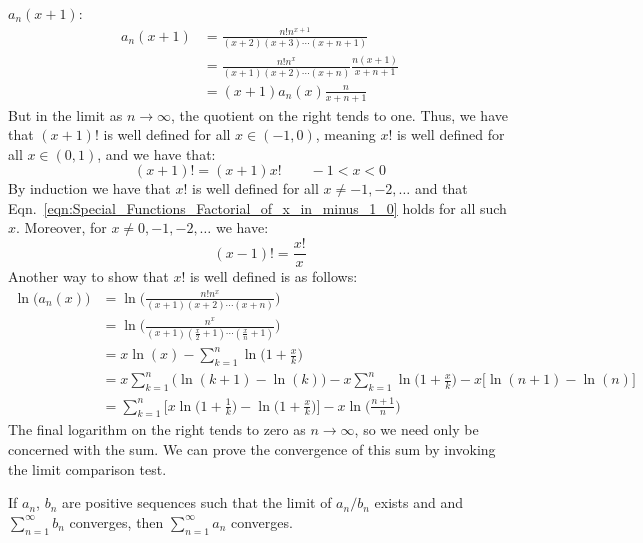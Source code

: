 \documentclass[crop=false,class=book,oneside]{standalone}
\begin{document}
        $a_{n}(x+1)$:
        \begin{align}
            a_{n}(x+1)
            &=\frac{n!n^{x+1}}{(x+2)(x+3)\cdots(x+n+1)}\\
            &=\frac{n!n^{x}}{(x+1)(x+2)\cdots(x+n)}
                \frac{n(x+1)}{x+n+1}\\
            &=(x+1)a_{n}(x)\frac{n}{x+n+1}
        \end{align}
        But in the limit as $n\rightarrow\infty$, the quotient on the right
        tends to one. Thus, we have that $(x+1)!$ is well defined for all
        $x\in(-1,0)$, meaning $x!$ is well defined for all
        $x\in(0,1)$, and we have that:
        \begin{equation}
            \label{eqn:Special_Functions_Factorial_of_x_in_minus_1_0}
            (x+1)!=(x+1)x!
            \quad\quad
            \minus{1}<x<0
        \end{equation}
        By induction we have that $x!$ is well defined for all
        $x\ne\minus{1},\minus{2},\dots$ and that
        Eqn.~\ref{eqn:Special_Functions_Factorial_of_x_in_minus_1_0}
        holds for all such $x$. Moreover, for
        $x\ne0,\minus{1},\minus{2},\dots$ we have:
        \begin{equation}
            (x-1)!=\frac{x!}{x}
        \end{equation}
        Another way to show that $x!$ is well defined is as follows:
        \begin{align}
            \ln\big(a_{n}(x)\big)
            &=\ln\Big(\frac{n!n^{x}}{(x+1)(x+2)\cdots(x+n)}\Big)\\
            &=\ln\Big(
                \frac{n^{x}}{(x+1)(\frac{x}{2}+1)\cdots(\frac{x}{n}+1)}
            \Big)\\
            &=x\ln(x)-\sum_{k=1}^{n}\ln\Big(1+\frac{x}{k}\Big)\\
            &=x\sum_{k=1}^{n}\Big(\ln(k+1)-\ln(k)\Big)
                -x\sum_{k=1}^{n}\ln\Big(1+\frac{x}{k}\Big)
                -x\Big[\ln(n+1)-\ln(n)\Big]\\
            &=\sum_{k=1}^{n}\Big[
                x\ln\Big(1+\frac{1}{k}\Big)-
                \ln\Big(1+\frac{x}{k}\Big)\Big]-x\ln\Big(\frac{n+1}{n}\Big)
        \end{align}
        The final logarithm on the right tends to zero as
        $n\rightarrow\infty$, so we need only be concerned with the sum.
        We can prove the convergence of this sum by invoking the limit
        comparison test.
        \begin{theorem}
            If $a_{n}$, $b_{n}$ are positive sequences such that
            the limit of $a_{n}/b_{n}$ exists and and
            $\sum_{n=1}^{\infty}b_{n}$ converges, then
            $\sum_{n=1}^{\infty}a_{n}$ converges.
        \end{theorem}
\end{document}
